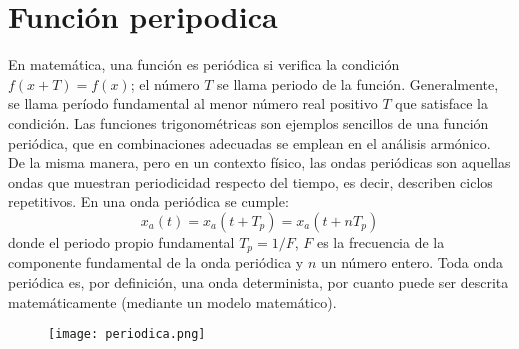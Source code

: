 \documentclass[a4paper,12pt]{report}
\begin{document}
\chapter{Función peripodica}
En matemática, una función es periódica si verifica la condición $f(x+T)=f(x)$; el número $T$ se llama periodo de la función. Generalmente, se llama período fundamental al menor número real positivo $T$ que satisface la condición. Las funciones trigonométricas son ejemplos sencillos de una función periódica, que en combinaciones adecuadas se emplean en el análisis armónico. De la misma manera, pero en un contexto físico, las ondas periódicas son aquellas ondas que muestran periodicidad respecto del tiempo, es decir, describen ciclos repetitivos. En una onda periódica se cumple:
$$
x_{a}(t) = x_{a}(t+T_{p}) = x_{a}(t+nT_{p})
$$
donde el periodo propio fundamental $T_{p} = 1/F$, $F$ es la frecuencia de la componente fundamental de la onda periódica y $n$ un número entero. Toda onda periódica es, por definición, una onda determinista, por cuanto puede ser descrita matemáticamente (mediante un modelo matemático).
\begin{figure}[H]
\centering
\texttt{[image: periodica.png]}
\end{figure}
\end{document}
